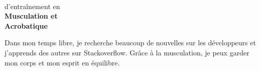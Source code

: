 \documentclass[10pt,A4]{article}
\begin{document}
\begin{minipage}{0.59\textwidth}
{		%
		\parbox[b][3cm][c]{3cm}{
			\begin{center}
			\\
			\textcolor{textcol}{d'entraînement en}\\
			\textcolor{textcol}{\textbf{Musculation et \\Acrobatique}}
			\end{center}
		}
		
		\parbox[b][3cm][c]{3.5cm}{
			\textcolor{textcol}{Dans mon temps libre, je recherche beaucoup de nouvelles sur les développeurs et j'apprends des autres sur Stackoverflow. Grâce à la musculation, je peux garder mon corps et mon esprit en équilibre.}
		}

	}

\vspace{-70pt}\end{minipage}
\begin{minipage}{0.05\textwidth}
	\begin{center}
	\end{center}
\end{minipage}
\end{document}
